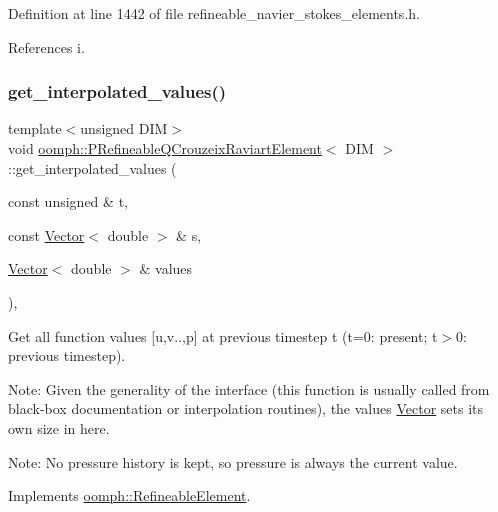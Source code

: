 Definition at line 1442 of file refineable\+\_\+navier\+\_\+stokes\+\_\+elements.\+h.



References i.

\mbox{\label{classoomph_1_1PRefineableQCrouzeixRaviartElement_af7337a2ad744a06a2e5c3590dcd07dfb}} 
\subsubsection{\texorpdfstring{get\+\_\+interpolated\+\_\+values()}{get\_interpolated\_values()}\hspace{0.1cm}{\footnotesize\ttfamily [2/2]}}
{\footnotesize\ttfamily template$<$unsigned D\+IM$>$ \\
void \hyperlink{classoomph_1_1PRefineableQCrouzeixRaviartElement}{oomph\+::\+P\+Refineable\+Q\+Crouzeix\+Raviart\+Element}$<$ D\+IM $>$\+::get\+\_\+interpolated\+\_\+values (\begin{DoxyParamCaption}\item[{const unsigned \&}]{t,  }\item[{const \hyperlink{classoomph_1_1Vector}{Vector}$<$ double $>$ \&}]{s,  }\item[{\hyperlink{classoomph_1_1Vector}{Vector}$<$ double $>$ \&}]{values }\end{DoxyParamCaption})\hspace{0.3cm}{\ttfamily [inline]}, {\ttfamily [virtual]}}



Get all function values \mbox{[}u,v..,p\mbox{]} at previous timestep t (t=0\+: present; t$>$0\+: previous timestep). 

Note\+: Given the generality of the interface (this function is usually called from black-\/box documentation or interpolation routines), the values \hyperlink{classoomph_1_1Vector}{Vector} sets its own size in here.

Note\+: No pressure history is kept, so pressure is always the current value. 

Implements \hyperlink{classoomph_1_1RefineableElement_ada6f0efe831ffefb1d2829ce01d45bfc}{oomph\+::\+Refineable\+Element}.



